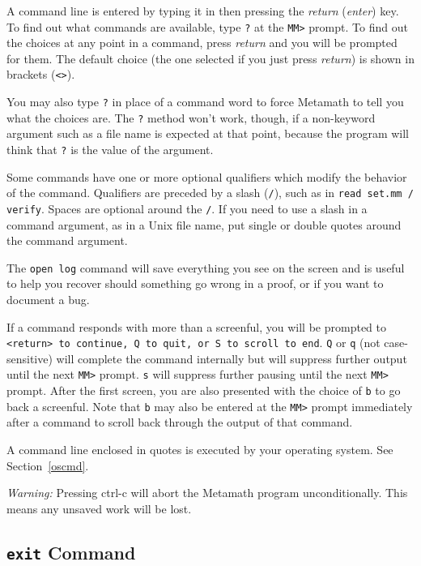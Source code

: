 A command line is entered by typing it in then pressing the {\em return}
({\em enter}) key.  To find out what commands are available, type
\texttt{?} at the \texttt{MM>} prompt.  To find out the choices at any
point in a command, press {\em return} and you will be prompted for
them.  The default choice (the one selected if you just press {\em
return}) is shown in brackets (\texttt{<>}).

You may also type \texttt{?} in place of a command word to force
Metamath to tell you what the choices are.  The \texttt{?} method won't
work, though, if a non-keyword argument such as a file name is expected
at that point, because the program will think that \texttt{?} is the
value of the argument.

Some commands have one or more optional qualifiers which modify the
behavior of the command.  Qualifiers are preceded by a slash
(\texttt{/}), such as in \texttt{read set.mm / verify}.  Spaces are
optional around the \texttt{/}.  If you need to use a slash in a command
argument, as in a Unix file name, put single or double quotes around the
command argument.

The \texttt{open log} command will save everything you see on the
screen and is useful to help you recover should something go wrong in a
proof, or if you want to document a bug.

If a command responds with more than a screenful, you will be
prompted to \texttt{<return> to continue, Q to quit, or S to scroll to
end}.  \texttt{Q} or \texttt{q} (not case-sensitive) will complete the
command internally but will suppress further output until the next
\texttt{MM>} prompt.  \texttt{s} will suppress further pausing until the
next \texttt{MM>} prompt.  After the first screen, you are also
presented with the choice of \texttt{b} to go back a screenful.  Note
that \texttt{b} may also be entered at the \texttt{MM>} prompt
immediately after a command to scroll back through the output of that
command.

A command line enclosed in quotes is executed by your operating system.
See Section~\ref{oscmd}.

{\em Warning:} Pressing {\sc ctrl-c} will abort the Metamath program
unconditionally.  This means any unsaved work will be lost.


\subsection{\texttt{exit} Command}

